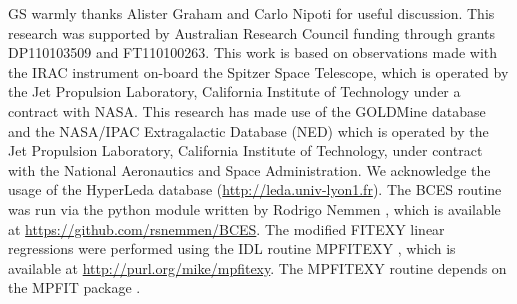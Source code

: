 \documentclass[preprint2]{emulateapj}
\begin{document}





\acknowledgments
GS warmly thanks Alister Graham and Carlo Nipoti for useful discussion. 
This research was supported by Australian Research Council funding through grants
DP110103509 and FT110100263.
This work is based on observations made with the IRAC instrument \citep{fazio2004IRAC} 
on-board the Spitzer Space Telescope, 
which is operated by the Jet Propulsion Laboratory, 
California Institute of Technology under a contract with NASA.
This research has made use of the GOLDMine database \citep{goldmine} and the NASA/IPAC Extragalactic Database (NED) 
which is operated by the Jet Propulsion Laboratory, California Institute of Technology, 
under contract with the National Aeronautics and Space Administration. 
We acknowledge the usage of the HyperLeda database (\url{http://leda.univ-lyon1.fr}).
The BCES routine \citep{akritasbershady1996} was run via the python module 
written by Rodrigo Nemmen \citep{nemmen2012}, which is available at \url{https://github.com/rsnemmen/BCES}.
The modified FITEXY linear regressions were performed using the IDL routine MPFITEXY \citep{williams2010}, 
which is available at \url{http://purl.org/mike/mpfitexy}. 
The MPFITEXY routine depends on the MPFIT package \citep{markwardt2009}.





\clearpage
\end{document}
